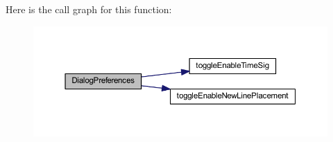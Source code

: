 Here is the call graph for this function\+:\nopagebreak
\begin{figure}[H]
\begin{center}
\leavevmode
\includegraphics[width=350pt]{classcom_1_1lclion_1_1midigui_1_1_dialog_preferences_a3a976528242fb285edfa4844685b2682_cgraph}
\end{center}
\end{figure}




